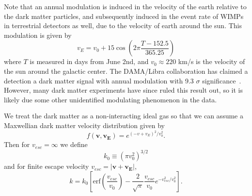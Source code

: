 Note that an annual modulation is induced in the velocity of the earth relative to the dark matter particles, and subsequently induced in the event rate of WIMPs in terrestrial detectors as well, due to the velocity of earth around the sun.  This modulation is given by 
\begin{equation}
v_E = v_0 + 15\cos \left(2\pi \frac{T - 152.5}{365.25} \right)
\end{equation}
where $T$ is measured in days from June 2nd, and $v_0 \approx 220$ km/s is the velocity of the sun around the galactic center. The DAMA/Libra collaboration has claimed a detection a dark matter signal with annual modulation with 9.3 $\sigma$ significance~\cite{Bernabei:2013xsa}.  However, many dark matter experiments have since ruled this result out, so it is likely due some other unidentified modulating phenomenon in the data.

We treat the dark matter as a non-interacting ideal gas so that we can assume a Maxwellian dark matter velocity distribution given by
\begin{equation}
f(\mathbf{v},\mathbf{v_E})=e^{(-v+v_{E})^2/v_0^2}.
\end{equation}
Then for $v_{esc}=\infty$ we define
\begin{equation} \label{k-not}
k_0 \equiv (\pi v_0^2)^{3/2}
\end{equation}
and for finite escape velocity $v_{esc}=|\mathbf{v}+\mathbf{v_E}|$,
\begin{equation}
k=k_0 \left[\mbox{erf}(\frac{v_{esc}}{v_0}) - \frac{2}{\sqrt{\pi}} \frac{v_{esc}}{v_0} e^{-v_{esc}^2/v_0^2} \right].
\end{equation}

